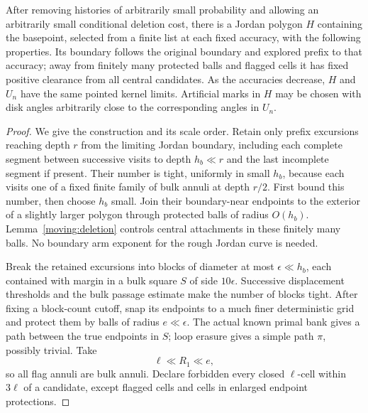 \begin{lemma}\label{moving:obstacle}
After removing histories of arbitrarily small probability and allowing
an arbitrarily small conditional deletion cost, there is a Jordan
polygon $H$ containing the basepoint, selected from a finite list at
each fixed accuracy, with the following properties.
Its boundary follows the original boundary and explored prefix to
that accuracy; away from finitely many protected balls and flagged
cells it has fixed positive clearance from all central candidates.
As the accuracies decrease, $H$ and $U_n$ have the same pointed kernel
limits.  Artificial marks in $H$ may be chosen with disk angles
arbitrarily close to the corresponding angles in $U_n$.
\end{lemma}
\begin{proof}
We give the construction and its scale order.  Retain only prefix
excursions reaching depth $r$ from the limiting Jordan boundary,
including each complete segment between successive visits to depth
$h_b\ll r$ and the last incomplete segment if present.  Their number
is tight, uniformly in small $h_b$, because each visits one of a fixed
finite family of bulk annuli at depth $r/2$.  First bound this number,
then choose $h_b$ small.  Join their boundary-near endpoints to the
exterior of a slightly larger polygon through protected balls of
radius $O(h_b)$.  Lemma~\ref{moving:deletion} controls central
attachments in these finitely many balls.  No boundary arm exponent
for the rough Jordan curve is needed.

Break the retained excursions into blocks of diameter at most
$\epsilon\ll h_b$, each contained with margin in a bulk square $S$
of side $10\epsilon$.  Successive displacement thresholds and the
bulk passage estimate make the number of blocks tight.  After fixing
a block-count cutoff, snap its endpoints to a much finer deterministic
grid and protect them by balls of radius $e\ll\epsilon$.  The actual
known primal bank gives a path between the true endpoints in $S$;
loop erasure gives a simple path $\pi$, possibly trivial.  Take
\[
 \ell\ll R_1\ll e,
\]
so all flag annuli are bulk annuli.  Declare forbidden every closed
$\ell$-cell within $3\ell$ of a candidate, except flagged cells and
cells in enlarged endpoint protections.


\end{proof}
